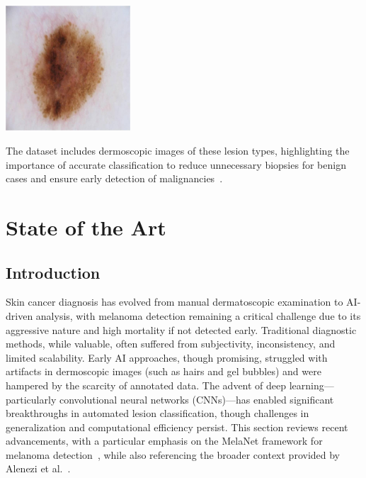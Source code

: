 \documentclass[a4paper,12pt]{report}
\begin{document}
\begin{spacing}{1.5}
\begin{itemize}
        \begin{center}
            \includegraphics[width=0.35\textwidth]{Pics/cancer/nevus.jpg}
        \end{center}
    \end{itemize}
    The dataset includes dermoscopic images of these lesion types, highlighting the importance of accurate classification to reduce unnecessary biopsies for benign cases and ensure early detection of malignancies~\cite{dl15}.

\newpage


\chapter{State of the Art}

    \section{Introduction}
    
    Skin cancer diagnosis has evolved from manual dermatoscopic examination to AI-driven analysis, with melanoma detection remaining a critical challenge due to its aggressive nature and high mortality if not detected early. Traditional diagnostic methods, while valuable, often suffered from subjectivity, inconsistency, and limited scalability. Early AI approaches, though promising, struggled with artifacts in dermoscopic images (such as hairs and gel bubbles) and were hampered by the scarcity of annotated data. The advent of deep learning—particularly convolutional neural networks (CNNs)—has enabled significant breakthroughs in automated lesion classification, though challenges in generalization and computational efficiency persist. This section reviews recent advancements, with a particular emphasis on the MelaNet framework for melanoma detection~\cite{lafraxo2022melanet}, while also referencing the broader context provided by Alenezi et al.~\cite{elgendi2023diagnostics}.
    

\end{spacing}
\end{document}
